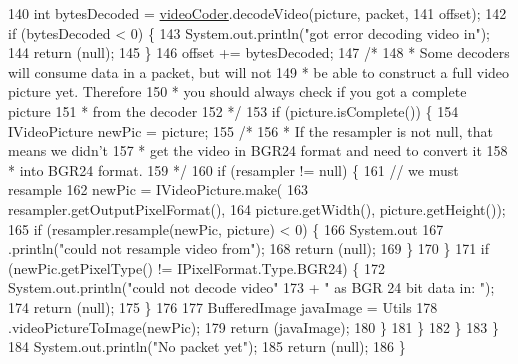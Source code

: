 \begin{DoxyCode}
140                     \textcolor{keywordtype}{int} bytesDecoded = \hyperlink{classworkspace_1_1_a_r_drone_capture_image_1_1src_1_1_display_camera_image_a13aa4bcc23766e6bac7e49ea7c882019}{videoCoder}.decodeVideo(picture, packet,
141                             offset);
142                     \textcolor{keywordflow}{if} (bytesDecoded < 0) \{
143                         System.out.println(\textcolor{stringliteral}{"got error decoding video in"});
144                         \textcolor{keywordflow}{return} (null);
145                     \}
146                     offset += bytesDecoded;
147                     \textcolor{comment}{/*}
148 \textcolor{comment}{                     * Some decoders will consume data in a packet, but will not
}
149 \textcolor{comment}{                     * be able to construct a full video picture yet. Therefore
}
150 \textcolor{comment}{                     * you should always check if you got a complete picture
}
151 \textcolor{comment}{                     * from the decoder
}
152 \textcolor{comment}{                     */}
153                     \textcolor{keywordflow}{if} (picture.isComplete()) \{
154                         IVideoPicture newPic = picture;
155                         \textcolor{comment}{/*}
156 \textcolor{comment}{                         * If the resampler is not null, that means we didn't
}
157 \textcolor{comment}{                         * get the video in BGR24 format and need to convert it
}
158 \textcolor{comment}{                         * into BGR24 format.
}
159 \textcolor{comment}{                         */}
160                         \textcolor{keywordflow}{if} (resampler != null) \{
161                             \textcolor{comment}{// we must resample}
162                             newPic = IVideoPicture.make(
163                                     resampler.getOutputPixelFormat(),
164                                     picture.getWidth(), picture.getHeight());
165                             \textcolor{keywordflow}{if} (resampler.resample(newPic, picture) < 0) \{
166                                 System.out
167                                         .println(\textcolor{stringliteral}{"could not resample video from"});
168                                 \textcolor{keywordflow}{return} (null);
169                             \}
170                         \}
171                         \textcolor{keywordflow}{if} (newPic.getPixelType() != IPixelFormat.Type.BGR24) \{
172                             System.out.println(\textcolor{stringliteral}{"could not decode video"}
173                                     + \textcolor{stringliteral}{" as BGR 24 bit data in: "});
174                             \textcolor{keywordflow}{return} (null);
175                         \}
176 
177                         BufferedImage javaImage = Utils
178                                 .videoPictureToImage(newPic);
179                         \textcolor{keywordflow}{return} (javaImage);
180                     \}
181                 \}
182             \}
183         \}
184         System.out.println(\textcolor{stringliteral}{"No packet yet"});
185         \textcolor{keywordflow}{return} (null);
186     \}
\end{DoxyCode}


